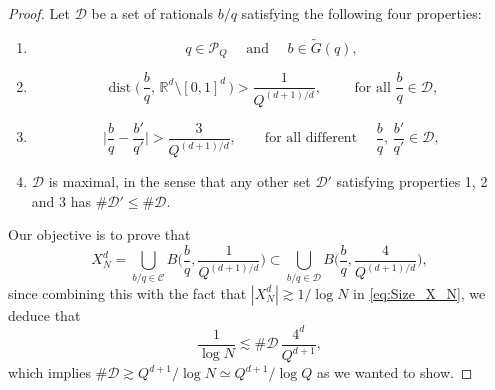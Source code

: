 \documentclass[11pt,reqno]{amsart}
\theoremstyle{definition}
\numberwithin{equation}{section}
\theoremstyle{remark}
\begin{document}
\begin{proof}
Let $\mathcal D$ be a set of rationals $b/q$ satisfying the following four properties:
\begin{enumerate}[1.]
    
    \item \[ q \in \mathcal P_Q \quad \text{ and } \quad  b \in \widetilde{G}(q), \]

    \item 
    \begin{equation}
        \operatorname{dist}\Big( \, \frac{b}{q}, \,  \mathbb R^d \setminus [0,1]^d \, \Big) > \frac{1}{Q^{(d+1)/d}},
        \qquad \text{ for all } \frac{b}{q} \in \mathcal D, 
    \end{equation}

    \item 
    \begin{equation}
        \Big| \frac{b}{q} - \frac{b'}{q'} \Big| > \frac{3}{Q^{(d+1)/d}}, 
        \qquad \text{for all different } \quad \frac{b}{q}, \, \frac{b'}{q'} \in \mathcal D,
    \end{equation}

    \item $\mathcal D$ is maximal, in the sense that any other set $\mathcal D'$ satisfying properties 1, 2 and 3 has $\#\mathcal D' \leq \#\mathcal D$. 

\end{enumerate}

Our objective is to prove that
\begin{equation}\label{eq:Cover_Disjoint}
    X_N^d = \bigcup_{b/q \in \mathcal C} B\Big( \frac{b}{q}, \frac{1}{Q^{(d+1)/d}} \Big)  
    \subset 
    \bigcup_{b/q \in \mathcal D} B\Big( \frac{b}{q}, \frac{4}{Q^{(d+1)/d}} \Big), 
\end{equation}
since combining this with the fact that $|X_N^d| \gtrsim 1/\log N $ in \eqref{eq:Size_X_N}, 
we deduce that 
\begin{equation}
    \frac{1}{\log N} \lesssim \#\mathcal D \, \frac{4^d}{Q^{d+1}},
\end{equation}
which implies $\#\mathcal D \gtrsim Q^{d+1}/ \log N \simeq Q^{d+1}/ \log Q$ as we wanted to show. 



\end{proof}
\end{document}
